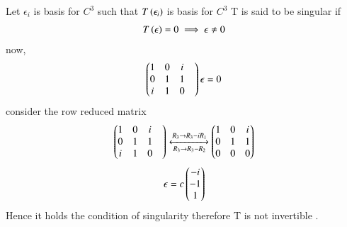  Let $\epsilon_i$ is basis for $C^{3}$ such that  $T\left(\epsilon_i\right)$ is basis for $C^{3}$
T  is said to be singular if 
\begin{align}
 T\left(\mathbf{\epsilon}\right)=0 \implies \epsilon \ne 0
\end{align}
now,
\begin{align}
\begin{pmatrix}1&0&i\\0&1&1&\\i&1&0\end{pmatrix}\mathbf{\epsilon}=0
\end{align}
consider the row reduced matrix
\begin{align}
    \begin{pmatrix}1&0&i\\0&1&1&\\i&1&0\end{pmatrix}
    \xleftrightarrow[R_3\rightarrow R_3-R_2]{R_3\rightarrow R_3-iR_1}\begin{pmatrix}1&0&i\\0&1&1\\0&0&0\end{pmatrix}
\end{align}
\begin{align}
    \mathbf{\epsilon} = c\begin{pmatrix}-i\\-1\\1\end{pmatrix}
\end{align}
Hence it  holds the condition of  singularity therefore T is not invertible . 

